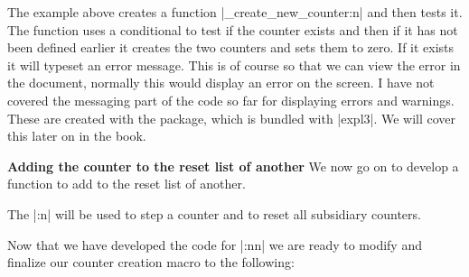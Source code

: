 The example above creates a function |\phd_create_new_counter:n| and then tests it. The function uses a conditional to test if the counter exists  and then if it has not been defined earlier it creates the two counters and sets them to zero. If it exists it will typeset an error message. This is of course so that we can view the error in the document, normally this would display an error on the screen. I have not covered the messaging part of the code so far for displaying errors and warnings. These are created with the  package, which is bundled with |expl3|. We will cover this later on in the book. 

\textbf{Adding the counter to the reset list of another} We now go on to develop a function to add to the reset list of another.


The |\stepcounter:n| will be used to step a counter and to reset all subsidiary counters. 



Now that we have developed the code for |\addtoreset:nn| we are ready to modify and finalize our counter creation macro to the following:


